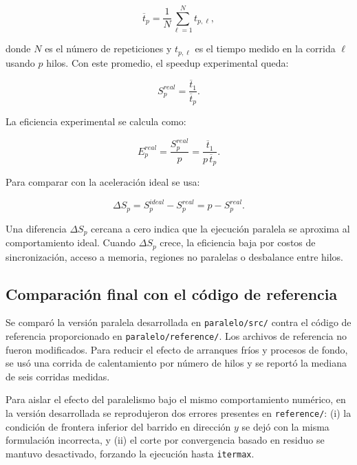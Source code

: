 \documentclass[11pt,a4paper]{article}
\begin{document}
\begin{equation}
\overline{t}_p=\frac{1}{N}\sum_{\ell=1}^{N}t_{p,\ell},
\end{equation}

donde $N$ es el n\'umero de repeticiones y $t_{p,\ell}$ es el tiempo medido en
la corrida $\ell$ usando $p$ hilos. Con este promedio, el speedup experimental
queda:

\begin{equation}
S_p^{real}=\frac{\overline{t}_1}{\overline{t}_p}.
\end{equation}

La eficiencia experimental se calcula como:

\begin{equation}
E_p^{real}=\frac{S_p^{real}}{p}
=\frac{\overline{t}_1}{p\,\overline{t}_p}.
\end{equation}

Para comparar con la aceleraci\'on ideal se usa:

\begin{equation}
\Delta S_p = S_p^{ideal}-S_p^{real}=p-S_p^{real}.
\end{equation}

Una diferencia $\Delta S_p$ cercana a cero indica que la ejecuci\'on paralela se
aproxima al comportamiento ideal. Cuando $\Delta S_p$ crece, la eficiencia baja
por costos de sincronizaci\'on, acceso a memoria, regiones no paralelas o
desbalance entre hilos.

\subsection{Comparaci\'on final con el c\'odigo de referencia}

Se compar\'o la versi\'on paralela desarrollada en \texttt{paralelo/src/} contra
el c\'odigo de referencia proporcionado en \texttt{paralelo/reference/}. Los
archivos de referencia no fueron modificados. Para reducir el efecto de
arranques fr\'ios y procesos de fondo, se us\'o una corrida de calentamiento por
n\'umero de hilos y se report\'o la mediana de seis corridas medidas.

Para aislar el efecto del paralelismo bajo el mismo comportamiento num\'erico,
en la versi\'on desarrollada se reprodujeron dos errores presentes en
\texttt{reference/}: (i) la condici\'on de frontera inferior del barrido en
direcci\'on $y$ se dej\'o con la misma formulaci\'on incorrecta, y (ii) el corte
por convergencia basado en residuo se mantuvo desactivado, forzando la
ejecuci\'on hasta \texttt{itermax}.
\end{document}

